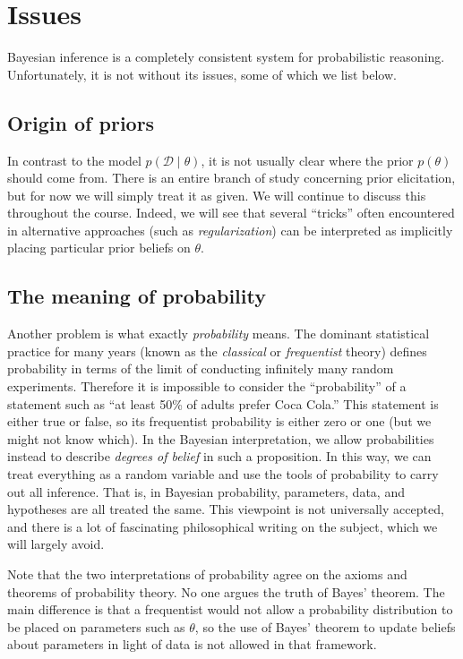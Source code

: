 \documentclass{article}
\newcommand{\given}{\mid}
\newcommand{\mc}[1]{\mathcal{#1}}
\newcommand{\data}{\mc{D}}
\begin{document}
\section*{Issues}

Bayesian inference is a completely consistent system for probabilistic
reasoning.  Unfortunately, it is not without its issues, some of which
we list below.

\subsection*{Origin of priors}

In contrast to the model $p(\data \given \theta)$, it is not usually
clear where the prior $p(\theta)$ should come from.  There is an
entire branch of study concerning prior elicitation, but for now we
will simply treat it as given.  We will continue to discuss this
throughout the course.  Indeed, we will see that several ``tricks''
often encountered in alternative approaches (such as
\emph{regularization}) can be interpreted as implicitly placing
particular prior beliefs on $\theta$.

\subsection*{The meaning of probability}

Another problem is what exactly \emph{probability} means.  The
dominant statistical practice for many years (known as the
\emph{classical} or \emph{frequentist} theory) defines probability in
terms of the limit of conducting infinitely many random experiments.
Therefore it is impossible to consider the ``probability'' of a
statement such as ``at least 50\% of adults prefer Coca Cola.''  This
statement is either true or false, so its frequentist probability is
either zero or one (but we might not know which).  In the Bayesian
interpretation, we allow probabilities instead to describe
\emph{degrees of belief} in such a proposition.  In this way, we can
treat everything as a random variable and use the tools of probability
to carry out all inference.  That is, in Bayesian probability,
parameters, data, and hypotheses are all treated the same.  This
viewpoint is not universally accepted, and there is a lot of
fascinating philosophical writing on the subject, which we will
largely avoid.

Note that the two interpretations of probability agree on the axioms
and theorems of probability theory.  No one argues the truth of Bayes'
theorem.  The main difference is that a frequentist would not allow a
probability distribution to be placed on parameters such as $\theta$,
so the use of Bayes' theorem to update beliefs about parameters in
light of data is not allowed in that framework.
\end{document}
